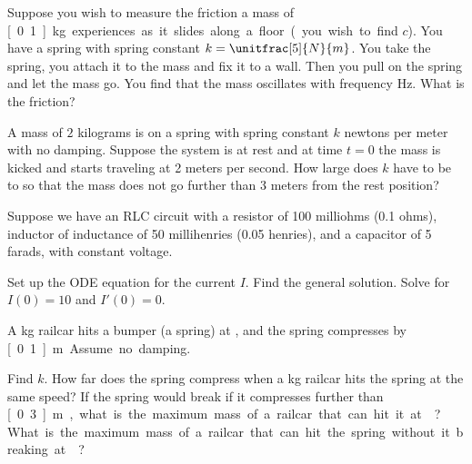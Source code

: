 \begin{exercise}
Suppose you wish to measure the friction a mass of \unit[0.1]{kg} experiences
as it slides along a floor (you wish to find $c$).  You have a spring with
spring constant $k=\unitfrac[5]{N}{m}$.  You take the spring, you attach it
to the mass and fix it to a wall.  Then you pull on the spring and let the
mass go.  You find that the mass oscillates with frequency \unit[1]{Hz}.
What is the friction?
\end{exercise}

\setcounter{exercise}{100}

\begin{exercise}
A mass of $2$ kilograms is on a spring with spring constant $k$ newtons per
meter with no damping.  Suppose the system is at rest and at time $t=0$ the
mass is kicked and starts traveling at 2 meters per second.  How large
does $k$ have to be to so that the mass does not go further than 3 meters
from the rest position?
\end{exercise}

\begin{exercise}
Suppose we have an RLC circuit with a resistor of 100 milliohms (0.1 ohms),
inductor of inductance of 50 millihenries (0.05 henries), and a capacitor of 5 farads, with
constant voltage.
\begin{tasks}
\task Set up the ODE equation for the current $I$.
\task Find the general solution.
\task Solve for $I(0) = 10$ and $I'(0) = 0$.
\end{tasks}
\end{exercise}

\begin{exercise}
\pagebreak[2]
A \unit[5000]{kg} railcar hits a bumper (a spring) at ,
and the spring compresses by \unit[0.1]{m}.  Assume no damping.
\begin{tasks}
\task Find $k$.
\task How far does the spring compress when a
\unit[10000]{kg} railcar hits the spring at the same speed?
\task If the spring
would break if it compresses further than \unit[0.3]{m}, what is the maximum
mass of a railcar that can hit it at ?
\task What is
the maximum mass of a railcar that can hit the spring without it breaking
at ?
\end{tasks}
\end{exercise}

